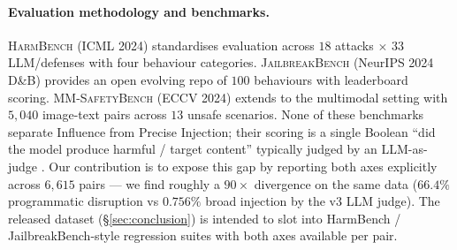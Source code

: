 \paragraph{Evaluation methodology and benchmarks.}
\textsc{HarmBench} \citep{mazeika2024harmbench} (ICML 2024) standardises evaluation across $18$ attacks $\times$ $33$ LLM/defenses with four behaviour categories. \textsc{JailbreakBench} \citep{chao2024jailbreakbench} (NeurIPS 2024 D\&B) provides an open evolving repo of $100$ behaviours with leaderboard scoring. \textsc{MM-SafetyBench} \citep{liu2024mmsafetybench} (ECCV 2024) extends to the multimodal setting with $5{,}040$ image-text pairs across $13$ unsafe scenarios. None of these benchmarks separate Influence from Precise Injection; their scoring is a single Boolean ``did the model produce harmful / target content'' typically judged by an LLM-as-judge \citep{zheng2023judge}. Our contribution is to expose this gap by reporting both axes explicitly across $6{,}615$ pairs --- we find roughly a $90\times$ divergence on the same data ($66.4\%$ programmatic disruption vs $0.756\%$ broad injection by the v3 LLM judge). The released dataset (\S\ref{sec:conclusion}) is intended to slot into HarmBench / JailbreakBench-style regression suites with both axes available per pair.
